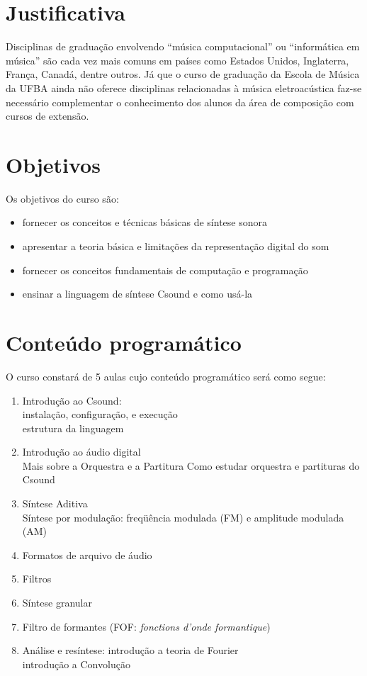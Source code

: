 \documentclass[12pt,brazil]{article}
\begin{document}
\section{Justificativa}

Disciplinas de graduação envolvendo ``música computacional'' ou
``informática em música'' são cada vez mais comuns em países como
Estados Unidos, Inglaterra, França, Canadá, dentre outros. Já que o
curso de graduação da Escola de Música da UFBA ainda não oferece
disciplinas relacionadas à música eletroacústica faz-se necessário
complementar o conhecimento dos alunos da área de composição com
cursos de extensão.

\section{Objetivos}

Os objetivos do curso são:

\begin{itemize}
\item fornecer os conceitos e técnicas básicas de síntese sonora 
\item apresentar a teoria básica e limitações da representação digital
  do som
\item fornecer os conceitos fundamentais de computação e programação
\item ensinar a linguagem de síntese Csound e como usá-la
\end{itemize}

\section{Conteúdo programático} 

O curso constará de 5 aulas cujo conteúdo programático será como
segue:

\begin{enumerate}
\item Introdução ao Csound: \\
  instalação, configuração, e execução \\
  estrutura da linguagem
\item Introdução ao áudio digital \\
  Mais sobre a Orquestra e a Partitura
  Como estudar orquestra e partituras do Csound
\item Síntese Aditiva \\
  Síntese por modulação: freqüência modulada (FM) e amplitude modulada (AM)
\item Formatos de arquivo de áudio
\item Filtros
\item Síntese granular
\item Filtro de formantes (FOF: \textit{fonctions d'onde formantique})
\item Análise e resíntese:
  introdução a teoria de Fourier \\
  introdução a Convolução \\
\end{enumerate} 
\end{document}
